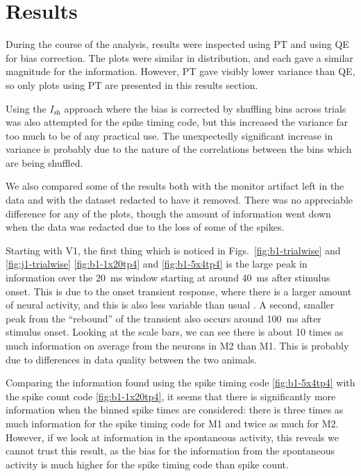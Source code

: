 \section{Results}

During the course of the analysis, results were inspected using \ac{PT} and using \ac{QE} for bias correction.
The plots were similar in distribution, and each gave a similar magnitude for the information.
However, \ac{PT} gave visibly lower variance than \ac{QE}, so only plots using \ac{PT} are presented in this results section.

Using the $I_{\text{sh}}$ approach where the bias is corrected by shuffling bins across trials \citep{Montemurro2007} was also attempted for the spike timing code, but this increased the variance far too much to be of any practical use.
The unexpectedly significant increase in variance is probably due to the nature of the correlations between the bins which are being shuffled.

We also compared some of the results both with the monitor artifact left in the data and with the dataset redacted to have it removed.
There was no appreciable difference for any of the plots, though the amount of information went down when the data was redacted due to the loss of some of the spikes.



Starting with \ac{V1}, the first thing which is noticed in Figs.~\ref{fig:b1-trialwise} and \ref{fig:j1-trialwise} \ref{fig:b1-1x20tp4} and \ref{fig:b1-5x4tp4} is the large peak in information over the \SI{20}{ms} window starting at around \SI{40}{ms} after stimulus onset.
This is due to the onset transient response, where there is a larger amount of neural activity, and this is also less variable than usual \citep{Muller2001}.
A second, smaller peak from the ``rebound'' of the transient also occurs around \SI{100}{ms} after stimulus onset.
Looking at the scale bars, we can see there is about 10 times as much information on average from the neurons in \ac{M2} than \ac{M1}.
This is probably due to differences in data quality between the two animals.

Comparing the information found using the spike timing code \ref{fig:b1-5x4tp4} with the spike count code \ref{fig:b1-1x20tp4}, it seems that there is significantly more information when the binned spike times are considered: there is three times as much information for the spike timing code for \ac{M1} and twice as much for \ac{M2}.
However, if we look at information in the spontaneous activity, this reveals we cannot trust this result, as the bias for the information from the spontaneous activity is much higher for the spike timing code than spike count.

